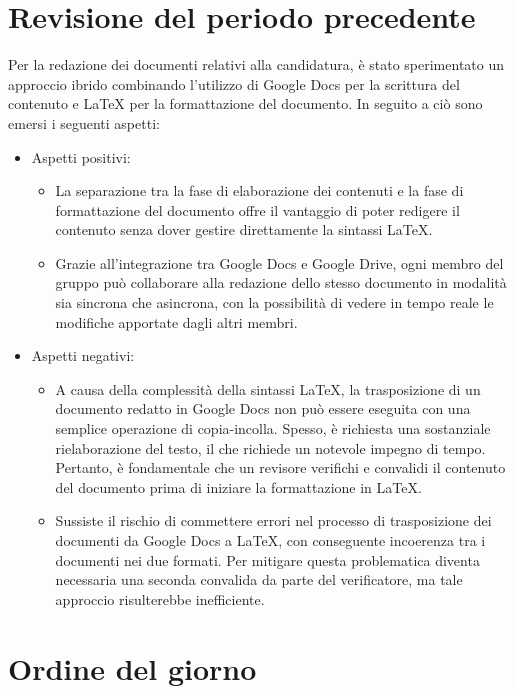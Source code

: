 \documentclass{article}
\begin{document}
\section{Revisione del periodo precedente}
Per la redazione dei documenti relativi alla candidatura, è stato sperimentato un approccio ibrido combinando l'utilizzo di Google Docs per la scrittura del contenuto e LaTeX per la formattazione del documento. In seguito a ciò sono emersi i seguenti aspetti:
\begin{itemize}
    \item Aspetti positivi:
        \begin{itemize}
            \item La separazione tra la fase di elaborazione dei contenuti e la fase di formattazione del documento offre il vantaggio di poter redigere il contenuto senza dover gestire direttamente la sintassi LaTeX.
            \item Grazie all’integrazione tra Google Docs e Google Drive, ogni membro del gruppo può collaborare alla redazione dello stesso documento in modalità sia sincrona che asincrona, con la possibilità di vedere in tempo reale le modifiche apportate dagli altri membri.
        \end{itemize}
    \item Aspetti negativi:
        \begin{itemize}
            \item A causa della complessità della sintassi LaTeX, la trasposizione di un documento redatto in Google Docs non può essere eseguita con una semplice operazione di copia-incolla. Spesso, è richiesta una sostanziale rielaborazione del testo, il che richiede un notevole impegno di tempo. Pertanto, è fondamentale che un revisore verifichi e convalidi il contenuto del documento prima di iniziare la formattazione in LaTeX.
            \item Sussiste il rischio di commettere errori nel processo di trasposizione dei documenti da Google Docs a LaTeX, con conseguente incoerenza tra i documenti nei due formati. Per mitigare questa problematica diventa necessaria una seconda convalida da parte del verificatore, ma tale approccio risulterebbe inefficiente.
        \end{itemize}
\end{itemize}

\section{Ordine del giorno}
\end{document}
